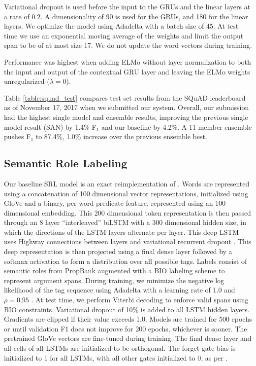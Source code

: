 \documentclass[11pt,a4paper]{article}
\newcommand{\ELMO}{ELMo}
\begin{document}
Variational dropout is used before the input to the GRUs and the linear layers at a rate of 0.2. 
A dimensionality of 90 is used for the GRUs, and 180 for the linear layers. We optimize the model using Adadelta with a batch size of 45. At test time we use an exponential moving average of the weights and limit the output span to be of at most size 17. We do not update the word vectors during training.

Performance was highest when adding \ELMO{} without layer normalization to both the input and output of the contextual GRU layer and leaving the \ELMO{} weights unregularized ($\lambda=0$).

Table \ref{table:squad_test} compares test set results from the SQuAD leaderboard as of November 17, 2017 when we submitted our system.
Overall, our submission had the highest single model and ensemble results, improving the previous single model result (SAN) by 1.4\% F$_1$ and our baseline by 4.2\%.  A 11 member ensemble pushes F$_1$ to 87.4\%, 1.0\% increase over the previous ensemble best.




\subsection{Semantic Role Labeling}
Our baseline SRL model is an exact reimplementation of \citep{He2017DeepSR}. Words are represented using a concatenation of 100 dimensional vector representations, initialized using GloVe \citep{Pennington2014GloveGV} and a binary, per-word predicate feature, represented using an 100 dimensional embedding. This 200 dimensional token representation is then passed through an 8 layer ``interleaved'' biLSTM with a 300 dimensional hidden size, in which the directions of the LSTM layers alternate per layer. This deep LSTM uses Highway connections \citep{Srivastava2015TrainingVD} between layers and variational recurrent dropout \citep{Gal2016ATG}. This deep representation is then projected using a final dense layer followed by a softmax activation to form a distribution over all possible tags. Labels consist of semantic roles from PropBank \citep{Palmer2005propbank} augmented with a BIO labeling scheme to represent argument spans. During training, we minimize the negative log likelihood of the tag sequence using Adadelta with a learning rate of 1.0 and $\rho = 0.95$ \citep{Zeiler2012ADADELTAAA}. At test time, we perform Viterbi decoding to enforce valid spans using BIO constraints. Variational dropout of 10\% is added to all LSTM hidden layers. Gradients are clipped if their value exceeds 1.0. Models are trained for 500 epochs or until validation F1 does not improve for 200 epochs, whichever is sooner. The pretrained GloVe vectors are fine-tuned during training. The final dense layer and all cells of all LSTMs are initialized to be orthogonal. The forget gate bias is initialized to 1 for all LSTMs, with all other gates initialized to 0, as per \citep{Jzefowicz2015AnEE}.
\end{document}
